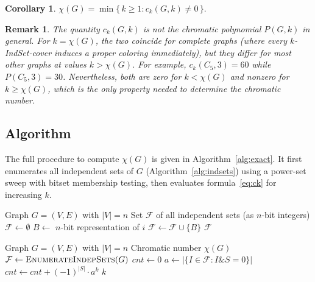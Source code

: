 \documentclass[11pt]{article}
\newtheorem{corollary}[theorem]{Corollary}
\newtheorem{remark}{Remark}
\begin{document}
\begin{corollary}
  $\chi(G) = \min\{\,k \geq 1 : c_k(G,k) \neq 0\,\}.$
\end{corollary}

\begin{remark}
  The quantity $c_k(G,k)$ is not the chromatic polynomial $P(G,k)$ in general.
  For $k = \chi(G)$, the two coincide for complete graphs (where every
  $k$-IndSet-cover induces a proper coloring immediately), but they differ for
  most other graphs at values $k > \chi(G)$.  For example, $c_k(C_5, 3) = 60$
  while $P(C_5, 3) = 30$.  Nevertheless, both are zero for $k < \chi(G)$ and
  nonzero for $k \geq \chi(G)$, which is the only property needed to determine
  the chromatic number.
\end{remark}

\subsection{Algorithm}

The full procedure to compute $\chi(G)$ is given in
Algorithm~\ref{alg:exact}.  It first enumerates all independent sets of $G$
(Algorithm~\ref{alg:indsets}) using a power-set sweep with bitset membership
testing, then evaluates formula~\eqref{eq:ck} for increasing $k$.

\begin{algorithm}
\caption{Enumerate all independent sets of $G$}\label{alg:indsets}
\begin{algorithmic}[1]
\Require Graph $G = (V, E)$ with $|V| = n$
\Ensure Set $\mathcal{F}$ of all independent sets (as $n$-bit integers)
\State $\mathcal{F} \gets \emptyset$
  \State $B \gets$ $n$-bit representation of $i$
    \State $\mathcal{F} \gets \mathcal{F} \cup \{B\}$
  \EndIf
\EndFor
\Return $\mathcal{F}$
\end{algorithmic}
\end{algorithm}

\begin{algorithm}
\caption{Compute $\chi(G)$ via inclusion-exclusion}\label{alg:exact}
\begin{algorithmic}[1]
\Require Graph $G = (V, E)$ with $|V| = n$
\Ensure Chromatic number $\chi(G)$
\State $\mathcal{F} \gets \textsc{EnumerateIndepSets}(G)$
  \State $\mathit{cnt} \gets 0$
    \State $a \gets |\{I \in \mathcal{F} : I \mathbin{\&} S = 0\}|$
    \State $\mathit{cnt} \gets \mathit{cnt} + (-1)^{|S|} \cdot a^k$
  \EndFor
    \Return $k$
  \EndIf
\EndFor
\end{algorithmic}
\end{algorithm}
\end{document}
